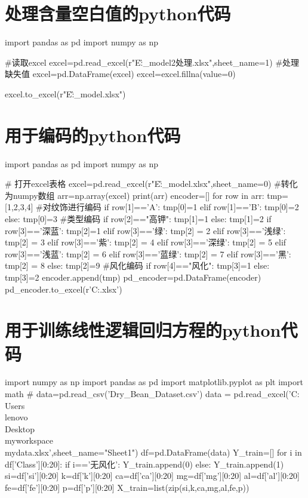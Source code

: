 \documentclass[withoutpreface,bwprint]{cumcmthesis} %
\begin{document}
\begin{appendices}
\section{处理含量空白值的python代码}
\begin{python}
	import pandas as pd
	import numpy as np
	
	#读取excel
	excel=pd.read_excel(r"E:\G\exercise\github{}_model\excel{}2处理.xlsx",sheet_name=1)
	#处理缺失值
	excel=pd.DataFrame(excel)
	excel=excel.fillna(value=0)
	
	excel.to_excel(r"E:\G\exercise\github{}_model\excel{}.xlsx")
\end{python}

\section{用于编码的python代码}
\begin{python}
	import pandas as pd
	import numpy as np
	
	# 打开excel表格
	excel=pd.read_excel(r"E:\G\exercise\github{}_model\C{}.xlsx",sheet_name=0)
	#转化为numpy数组
	arr=np.array(excel)
	print(arr)
	encoder=[]
	for row in arr:
	tmp=[1,2,3,4]
	#对纹饰进行编码
	if row[1]=='A':
	tmp[0]=1
	elif row[1]=='B':
	tmp[0]=2
	else:
	tmp[0]=3
	#类型编码
	if row[2]=="高钾":
	tmp[1]=1
	else:
	tmp[1]=2
	if row[3]=='深蓝':
	tmp[2]=1
	elif row[3]=='绿':
	tmp[2] = 2
	elif row[3]=='浅绿':
	tmp[2] = 3
	elif row[3]=='紫':
	tmp[2] = 4
	elif row[3]=='深绿':
	tmp[2] = 5
	elif row[3]=='浅蓝':
	tmp[2] = 6
	elif row[3]=='蓝绿':
	tmp[2] = 7
	elif row[3]=='黑':
	tmp[2] = 8
	else:
	tmp[2]=9
	#风化编码
	if row[4]=="风化":
	tmp[3]=1
	else:
	tmp[3]=2
	encoder.append(tmp)
	pd_encoder=pd.DataFrame(encoder)
	pd_encoder.to_excel(r'C:\Users{}\Desktop{}.xlsx')
\end{python}


\section{用于训练线性逻辑回归方程的python代码}

\begin{python}
	import numpy as np
	import pandas as pd
	import matplotlib.pyplot as plt
	import math
	# data=pd.read_csv('Dry_Bean_Dataset.csv')
	data = pd.read_excel('C:\\Users\\lenovo\\Desktop\\myworkspace\\mydata.xlsx',sheet_name="Sheet1")
	df=pd.DataFrame(data)
	Y_train=[]
	for i in df['Class'][0:20]:
	if i=='无风化':
	Y_train.append(0)
	else:
	Y_train.append(1)
	si=df['si'][0:20]
	k=df['k'][0:20]
	ca=df['ca'][0:20]
	mg=df['mg'][0:20]
	al=df['al'][0:20]
	fe=df['fe'][0:20]
	p=df['p'][0:20]
	X_train=list(zip(si,k,ca,mg,al,fe,p))
	

\end{python}
\end{appendices}
\end{document}
